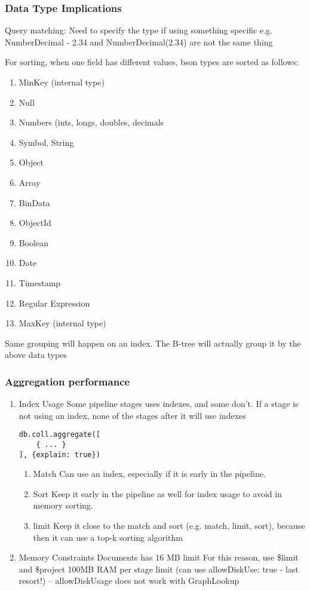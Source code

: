 \documentclass[11pt]{article}
\begin{document}
\subsubsection{Data Type Implications}
\label{sec:orgb63e555}
Query matching:
Need to specify the type if using something specific e.g. NumberDecimal - 2.34 and NumberDecimal(2.34) are not the same thing

For sorting, when one field has different values, bson types are sorted as follows:
\begin{enumerate}
\item MinKey (internal type)
\item Null
\item Numbers (ints, longs, doubles, decimals
\item Symbol, String
\item Object
\item Array
\item BinData
\item ObjectId
\item Boolean
\item Date
\item Timestamp
\item Regular Expression
\item MaxKey (internal type)
\end{enumerate}

Same grouping will happen on an index. The B-tree will actually group it by the above data types

\subsubsection{Aggregation performance}
\label{sec:org9066cc5}
\begin{enumerate}
\item Index Usage
\label{sec:org1d00f42}
Some pipeline stages uses indexes, and some don't. If a stage is not using an index, none of the stages after it will use indexes

\begin{verbatim}
db.coll.aggregate([
    { ... }
], {explain: true})
\end{verbatim}
\begin{enumerate}
\item Match
\label{sec:org0236abf}
Can use an index, especially if it is early in the pipeline.
\item Sort
\label{sec:org7e13c5f}
Keep it early in the pipeline as well for index usage to avoid in memory sorting.
\item limit
\label{sec:org7a28ee6}
Keep it close to the match and sort (e.g. match, limit, sort), because then it can use a top-k sorting algorithm
\end{enumerate}

\item Memory Constraints
\label{sec:orge3d6c76}
Documents has 16 MB limit
For this reason, use \$limit and \$project
100MB RAM per stage limit (can use allowDiskUse: true - last resort!)
 -- allowDiskUsage does not work with GraphLookup
\end{enumerate}
\end{document}
